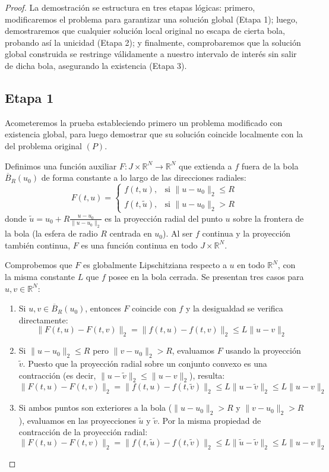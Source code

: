\begin{proof}
    La demostración se estructura en tres etapas lógicas: primero, modificaremos el problema para garantizar una solución global (Etapa 1); luego, demostraremos que cualquier solución local original no escapa de cierta bola, probando así la unicidad (Etapa 2); y finalmente, comprobaremos que la solución global construida se restringe válidamente a nuestro intervalo de interés sin salir de dicha bola, asegurando la existencia (Etapa 3).

    \subsection*{Etapa 1}
    Acometeremos la prueba estableciendo primero un problema modificado con existencia global, para luego demostrar que su solución coincide localmente con la del problema original $(P)$.
    
    Definimos una función auxiliar $F : J \times \mathbb{R}^N \to \mathbb{R}^N$ que extienda a $f$ fuera de la bola $\overline{B}_R(u_0)$ de forma constante a lo largo de las direcciones radiales:
    \[
        F(t,u) = \begin{cases}
            f(t,u), & \text{si } \| u - u_0 \|_2 \leq R \\
            f(t, \tilde{u}), & \text{si } \| u - u_0 \|_2 > R
        \end{cases}
    \]
    donde $\tilde{u} = u_0 + R \frac{u - u_0}{\| u - u_0 \|_2}$ es la proyección radial del punto $u$ sobre la frontera de la bola (la esfera de radio $R$ centrada en $u_0$). Al ser $f$ continua y la proyección también continua, $F$ es una función continua en todo $J \times \mathbb{R}^N$. 
    
    Comprobemos que $F$ es globalmente Lipschitziana respecto a $u$ en todo $\mathbb{R}^N$, con la misma constante $L$ que $f$ posee en la bola cerrada. Se presentan tres casos para $u, v \in \mathbb{R}^N$:
    \begin{enumerate}
        \item Si $u, v \in \overline{B}_R (u_0)$, entonces $F$ coincide con $f$ y la desigualdad se verifica directamente:
        \[
            \| F(t,u) - F(t,v) \|_2 = \| f(t,u) - f(t,v) \|_2 \leq L \| u - v \|_2
        \]
        \item Si $\| u - u_0 \|_2 \leq R$ pero $\| v - u_0 \|_2 > R$, evaluamos $F$ usando la proyección $\tilde{v}$. Puesto que la proyección radial sobre un conjunto convexo es una contracción (es decir, $\| u - \tilde{v} \|_2 \leq \| u - v \|_2$), resulta:
        \[
            \| F(t,u) - F(t,v) \|_2 = \| f(t,u) - f(t, \tilde{v}) \|_2 \leq L \| u - \tilde{v} \|_2 \leq L \| u - v \|_2
        \]
        \item Si ambos puntos son exteriores a la bola ($\| u - u_0 \|_2 > R$ y $\| v - u_0 \|_2 > R$), evaluamos en las proyecciones $\tilde{u}$ y $\tilde{v}$. Por la misma propiedad de contracción de la proyección radial:
        \[
            \| F(t,u) - F(t,v) \|_2 = \| f(t, \tilde{u}) - f(t, \tilde{v}) \|_2 \leq L \| \tilde{u} - \tilde{v} \|_2 \leq L \| u - v \|_2
        \]
    \end{enumerate} 
    

\end{proof}
